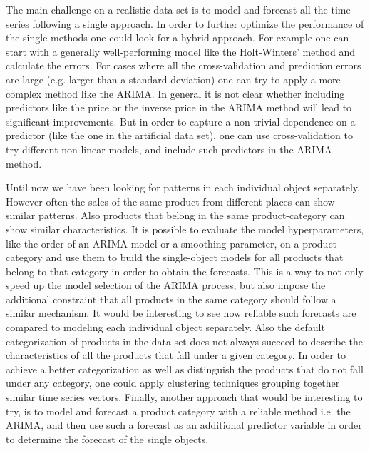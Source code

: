 \documentclass[12pt, letterpaper]{article}\usepackage[]{graphicx}\usepackage[]{color}
\begin{document}
The main challenge on a realistic data set is to model and forecast all the time series following a single approach. In order to further optimize the performance of the single methods one could look for a hybrid approach. For example one can start with a generally well-performing model like the Holt-Winters' method and calculate the errors. For cases where all the cross-validation and prediction errors are large (e.g. larger than a standard deviation) one can try to apply a more complex method like the ARIMA. In general it is not clear whether including predictors like the price or the inverse price in the ARIMA method will lead to significant improvements. But in order to capture a non-trivial dependence on a predictor (like the one in the artificial data set), one can use cross-validation to try different non-linear models, and include such predictors in the ARIMA method. 

Until now we have been looking for patterns in each individual object separately. However often the sales of the same product from different places can show similar patterns. Also products that belong in the same product-category can show similar characteristics. It is possible to evaluate the model hyperparameters, like the order of an ARIMA model or a smoothing parameter, on a product category and use them to build the single-object models for all products that belong to that category in order to obtain the forecasts. This is a way to not only speed up the model selection of the ARIMA process, but also impose the additional constraint that all products in the same category should follow a similar mechanism. It would be interesting to see how reliable such forecasts are compared to modeling each individual object separately. Also the default categorization of products in the data set does not always succeed to describe the characteristics of all the products that fall under a given category. In order to achieve a better categorization as well as distinguish the products that do not fall under any category, one could apply clustering techniques grouping together similar time series vectors. Finally, another approach that would be interesting to try, is to model and forecast a product category with a reliable method i.e. the ARIMA, and then use such a forecast as an additional predictor variable in order to determine the forecast of the single objects. 
\end{document}
